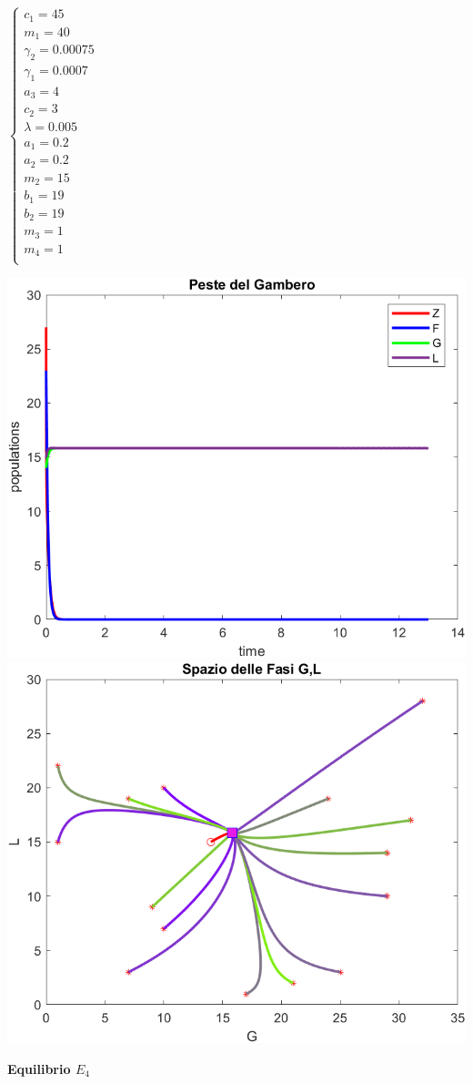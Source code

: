 \documentclass[12pt,a4paper]{article}
\numberwithin{theorem}{section}
\numberwithin{definition}{section}
\numberwithin{example}{section}
\newcommand{\deftitle}[1]{{\color{red}\bf{#1}\color{black}}}
\begin{document}
\begin{minipage}{0.2\textwidth}


$\begin{cases}
	c_1=45\\
	m_1=40 \\
	\gamma_2=0.00075\\
	\gamma_1=0.0007\\
	a_3=4\\
	c_2=3\\
	\lambda=0.005\\ %
	a_1=0.2\\
	a_2=0.2\\
	m_2=15\\
	b_1=19\\
	b_2=19\\
	m_3=1\\
	m_4=1\\
\end{cases}$ 
\end{minipage}
\begin{minipage}{0.7\textwidth}
    \centering
    \includegraphics[width=6 cm]{grafici/E3_fasi.png} 
    \\
    \includegraphics[width=6 cm]{grafici/E3_ritratto.png}
\end{minipage}

\vspace{1 cm}

\deftitle{Equilibrio $E_4$}
\end{document}
